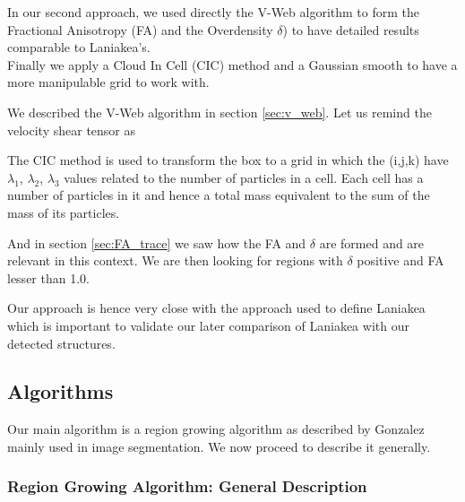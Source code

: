 \documentclass[12pt]{article}
\begin{document}
\begin{par}
In our second approach, we used directly the V-Web
 algorithm to form the Fractional Anisotropy (FA)
  and the Overdensity $\delta$) to have detailed
   results comparable to Laniakea's.\\
Finally we apply a Cloud In Cell (CIC) method and
 a Gaussian smooth to have a more manipulable grid
  to work with.\\
\end{par}


\begin{par}
We described the V-Web algorithm in section
 \ref{sec:v_web}. Let us remind the velocity shear
  tensor as 
\end{par}

\begin{par}
The CIC method is used to transform the box to a
 grid in which the (i,j,k) have {$\lambda_1$,
  $\lambda_2$, $\lambda_3$} values related to the
   number of particles in a cell.
Each cell has a number of particles in it and
 hence a total mass equivalent to the sum of the
  mass of its particles.
\end{par}

\begin{par}
And in section \ref{sec:FA_trace} we saw how the
 FA and $\delta$ are formed and are relevant in
  this context. 
We are then looking for regions with $\delta$
 positive and FA lesser than 1.0.
\end{par}

\begin{par}
Our approach is hence very close with the approach
 used to define Laniakea
  \cite{tully_laniakea_2014} which is important to
   validate our later comparison of Laniakea with
    our detected structures.
\end{par}

\subsection{Algorithms}

Our main algorithm is a region growing algorithm
 as described by Gonzalez
  \cite{gonzalez_digital_2008} mainly used in
   image segmentation. We now proceed to describe
    it generally.

\subsubsection{Region Growing Algorithm: General Description}
\end{document}
